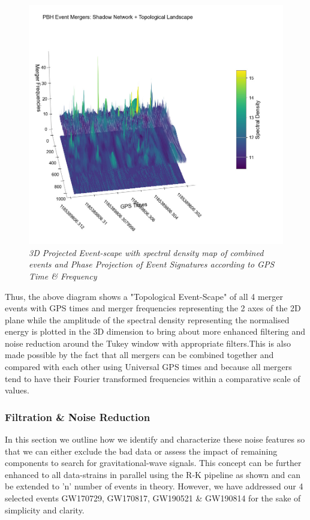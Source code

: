     \begin{figure}[H]
        \centering
        \includegraphics[width=1.0\linewidth]{images/48_05_Topo Transformed Eventscape with Phase Projected Network.jpg}
        \caption{\textit{3D Projected Event-scape with spectral density map of combined events and Phase Projection of Event Signatures according to GPS Time \& Frequency}}
        \label{fig:LIGO3_PlaceHolder_fig}
    \end{figure}

    Thus, the above diagram shows a "Topological Event-Scape" of all 4 merger events with GPS times and merger frequencies representing the 2 axes of the 2D plane while the amplitude of the spectral density representing the normalised energy is plotted in the 3D dimension to bring about more enhanced filtering and noise reduction around the Tukey window with appropriate filters.This is also made possible by the fact that all mergers can be combined together and compared with each other using Universal GPS times and because all mergers tend to have their Fourier transformed frequencies within a comparative scale of values.

    \subsubsection{Filtration \& Noise Reduction}

    In this section we outline how we identify and characterize these noise features so that we can either exclude the bad data or assess the impact of remaining components to search for gravitational-wave signals. This concept can be further enhanced to all data-strains in parallel using the R-K pipeline as shown and can be extended to 'n' number of events in theory. However, we have addressed our 4 selected events  GW170729, GW170817, GW190521 \& GW190814 for the sake of simplicity and clarity.

